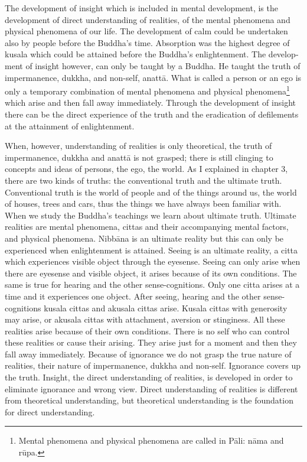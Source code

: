 \documentclass{book}
\begin{document}
The development of insight which is included in mental development, is
the development of direct under­standing of realities, of the mental
phenomena and physical phenomena of our life. The development of calm
could be undertaken also by people before the Buddha's time. Absorption
was the highest degree of kusala which could be attained before the
Buddha's enlightenment. The develop­ment of insight however, can only    be taught by a Buddha. He taught the truth of impermanence, dukkha, and    non-self, anattā. What is called a person or an ego is only a temporary combination of mental phenomena and physical phenomena\footnote{Mental phenomena and physical phenomena are called in Pāli: nāma and rūpa.} which arise and then fall away immediately. Through the development of insight there can be the direct experience of the truth and the 
eradication of defilements at the attainment of enlightenment.

When, however, understanding of realities is only theore­tical, the
truth of impermanence, dukkha and anattā is not grasped; there is still
clinging to concepts and ideas of persons, the ego, the world. As I
explained in chapter 3, there are two kinds of truths: the conventional
truth and the ultimate truth. Conventional truth is the world of people
and of the things around us, the world of houses, trees and cars, thus
the things we have always been familiar with. When we study the Buddha's
teachings we learn about ultimate truth. Ultimate realities are mental
phenomena, cittas and their accompanying mental factors, and physical
phenomena. Nibbāna is an ultimate reality but this can only be
experienced when enlighten­ment is attained. Seeing is an ultimate
reality, a citta which experiences visible object through the eyesense.
Seeing can only arise when there are eyesense and visible object, it
arises because of its own conditions. The same is true for hearing and
the other sense-cognitions. Only one citta arises at a time and it
experiences one object. After seeing, hearing and the other sense-
cognitions kusala cittas and akusala cittas arise. Kusala cittas
with generosity may arise, or akusala cittas with attachment, aversion
or stinginess. All these realities arise because of their own
conditions. There is no self who can control these realities or cause
their arising. They arise just for a moment and then they fall away
immediately. Because of ignorance we do not grasp the true nature of
realities, their nature of impermanence, dukkha and non-self. Ignorance
covers up the truth. Insight, the direct under­standing of realities, is
developed in order to eliminate ignorance and wrong view. Direct
understanding of realities is different from theoretical understanding,
but theoretical understanding is the foundation for direct
understanding.
\end{document}
